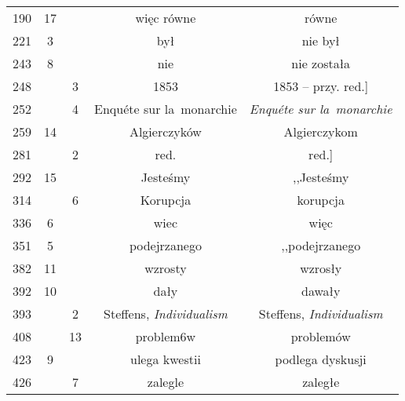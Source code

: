 \documentclass[a4paper,11pt]{article}  %
\begin{document}
\begin{center}
\begin{tabular}{|c|c|c|c|c|}
    190 & 17 & & więc równe & równe \\
    221 &  3 & & był & nie był \\
    243 &  8 & & nie & nie została \\
    248 & &  3 & 1853 & 1853 -- przy. red.] \\
    252 & &  4 & Enqu\'{e}te sur la~monarchie
           & \emph{Enqu\'{e}te sur la~monarchie} \\
    259 & 14 & & Algierczyków & Algierczykom \\
    281 & &  2 & red. & red.] \\
    292 & 15 & & Jesteśmy & ,,Jesteśmy %
    \\
    314 & &  6 & Korupcja & korupcja \\
    336 &  6 & & wiec & więc \\
    351 &  5 & & podejrzanego & ,,podejrzanego %
    \\
    382 & 11 & & wzrosty & wzrosły \\
    392 & 10 & & dały & dawały \\
    393 & &  2 & Steffens,{ }{ }\emph{Individualism}
           & Steffens, \emph{Individualism} \\
    408 & & 13 & problem6w & problemów \\
    423 &  9 & & ulega kwestii & podlega dyskusji \\
    426 & &  7 & zalegle & zaległe \\ \hline
  \end{tabular}
\end{center}
\end{document}
